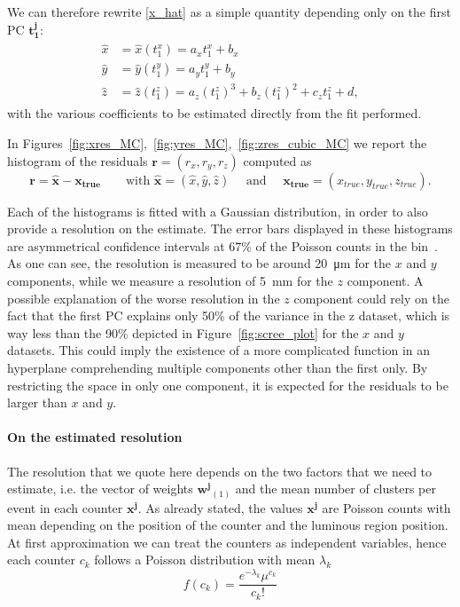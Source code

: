 We can therefore rewrite \eqref{x_hat} as a simple quantity depending only on the first PC $\mathbf{t^j_1}$:
\begin{align}
\begin{split}
    \hat{x} &= \hat{x}(t^x_1) = a_x t^x_1 + b_x \\
    \hat{y} &= \hat{y}(t^y_1) = a_y t^y_1 + b_y \\\label{x_hat_true}
    \hat{z} &= \hat{z}(t^z_1) = a_z (t^z_1)^3 + b_z (t^z_1)^2 + c_z  t^z_1 + d,
    \end{split}
\end{align} 
with the various coefficients to be estimated directly from the fit performed. 

In Figures~\ref{fig:xres_MC},~\ref{fig:yres_MC},~\ref{fig:zres_cubic_MC} we report the histogram of the residuals $\mathbf{r}=(r_x, r_y, r_z)$ computed as 
 \begin{equation}
     \mathbf{r}=\hat{\mathbf{x}} - \mathbf{x_{true}} \qquad \text{with } \hat{\mathbf{x}} = (\hat{x}, \hat{y}, \hat{z}) \quad \text{ and } \quad \mathbf{x_{true}}=(x_{true}, y_{true}, z_{true}).
 \end{equation}

 Each of the histograms is fitted with a Gaussian distribution, in order to also provide a resolution on the estimate. The error bars displayed in these histograms are asymmetrical confidence intervals at $67$\% of the Poisson counts in the bin~\cite{c91e9970-216b-3ca1-adc9-c0f78fd16662}.
 As one can see, the resolution is measured to be around \SI{20}{\micro\meter} for the $x$ and $y$ components, while we measure a resolution of \SI{5}{\milli\meter} for the $z$ component. A possible explanation of the worse resolution in the $z$ component could rely on the fact that the first PC explains only 50\% of the variance in the z dataset, which is way less than the 90\% depicted in Figure~\ref{fig:scree_plot} for the $x$ and $y$ datasets. This could imply the existence of a more complicated function in an hyperplane comprehending multiple components other than the first only. By restricting the space in only one component, it is expected for the residuals to be larger than $x$ and $y$.
 
 \paragraph{On the estimated resolution}
 The resolution that we quote here depends on the two factors that we need to estimate, i.e. the vector of weights $\mathbf{w^j}_{(1)}$ and the mean number of clusters per event in each counter $\mathbf{x^{j}}$. As already stated, the values $\mathbf{x^{j}}$ are Poisson counts with mean depending on the position of the counter and the luminous region position. At first approximation we can treat the counters as independent variables, hence each counter $c_k$ follows a Poisson distribution with mean $\lambda_k$
 \begin{equation}
     f(c_k) = \frac{e^{-\lambda_k} \mu^{c_k}}{c_k!}
 \end{equation}


